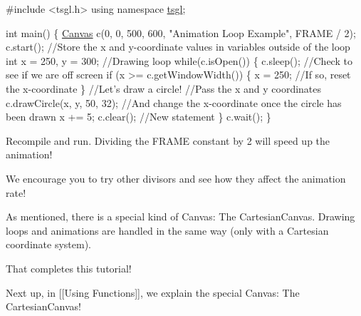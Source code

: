 \begin{DoxyCode}
\textcolor{preprocessor}{#include <tsgl.h>}
\textcolor{keyword}{using namespace }\hyperlink{namespacetsgl}{tsgl};

\textcolor{keywordtype}{int} main() \{
  \hyperlink{classtsgl_1_1_canvas}{Canvas} c(0, 0, 500, 600, \textcolor{stringliteral}{"Animation Loop Example"}, FRAME / 2);
  c.start();
  \textcolor{comment}{//Store the x and y-coordinate values in variables outside of the loop}
  \textcolor{keywordtype}{int} x = 250, y = 300;
  \textcolor{comment}{//Drawing loop}
  \textcolor{keywordflow}{while}(c.isOpen()) \{
    c.sleep();
    \textcolor{comment}{//Check to see if we are off screen}
    \textcolor{keywordflow}{if} (x >= c.getWindowWidth()) \{
       x = 250; \textcolor{comment}{//If so, reset the x-coordinate}
    \}
    \textcolor{comment}{//Let's draw a circle!}
    \textcolor{comment}{//Pass the x and y coordinates}
    c.drawCircle(x, y, 50, 32);
    \textcolor{comment}{//And change the x-coordinate once the circle has been drawn}
    x += 5;
    c.clear(); \textcolor{comment}{//New statement}
  \}
  c.wait();
\}
\end{DoxyCode}


Recompile and run. Dividing the F\+R\+A\+M\+E constant by 2 will speed up the animation!

We encourage you to try other divisors and see how they affect the animation rate!

As mentioned, there is a special kind of Canvas\+: The Cartesian\+Canvas. Drawing loops and animations are handled in the same way (only with a Cartesian coordinate system).

That completes this tutorial!

Next up, in \mbox{[}\mbox{[}Using Functions\mbox{]}\mbox{]}, we explain the special Canvas\+: The Cartesian\+Canvas! 